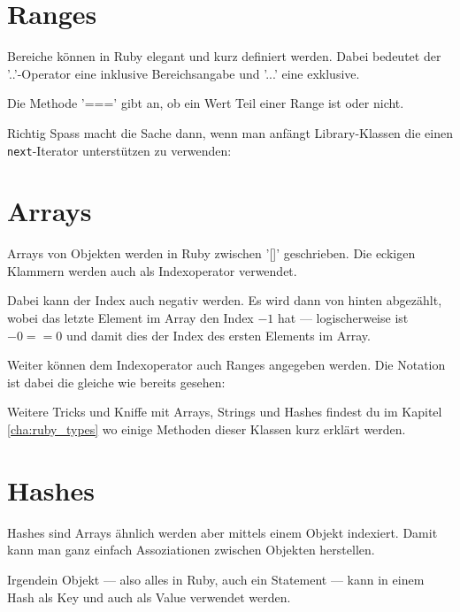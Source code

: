 \documentclass[a4book,11pt,twoside]{scrbook}
\begin{document}
\section{Ranges}
Bereiche können in Ruby elegant und kurz definiert werden. Dabei bedeutet der '..'-Operator eine inklusive Bereichsangabe und '...' eine exklusive.

Die Methode '===' gibt an, ob ein Wert Teil einer Range ist oder nicht.




Richtig Spass macht die Sache dann, wenn man anfängt Library-Klassen die einen \texttt{next}-Iterator unterstützen zu verwenden:







\section{Arrays} %
\label{sec:arrays}
Arrays von Objekten werden in Ruby zwischen '[]' geschrieben. Die eckigen Klammern werden auch als Indexoperator verwendet.

Dabei kann der Index auch negativ werden. Es wird dann von hinten abgezählt, wobei das letzte Element im Array den Index $-1$ hat — logischerweise ist $-0 == 0$ und damit dies der Index des ersten Elements im Array.





Weiter können dem Indexoperator auch Ranges angegeben werden. Die Notation ist dabei die gleiche wie bereits gesehen:




Weitere Tricks und Kniffe mit Arrays, Strings und Hashes findest du im Kapitel \ref{cha:ruby_types} wo einige Methoden dieser Klassen kurz erklärt werden.


\section{Hashes} %
\label{sub:hashes}
Hashes sind Arrays ähnlich werden aber mittels einem Objekt indexiert. Damit kann man ganz einfach Assoziationen zwischen Objekten herstellen.

Irgendein Objekt — also alles in Ruby, auch ein Statement — kann in einem Hash als Key und auch als Value verwendet werden.
\end{document}
